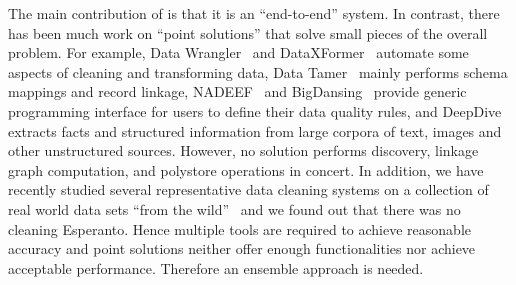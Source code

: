 \smallskip
The main contribution of \dcv is that it is an ``end-to-end'' system. In contrast, there has been much work on ``point solutions'' that solve small pieces of the overall problem. 
For example, Data Wrangler~\cite{2011-wrangler} and DataXFormer~\cite{DBLP:conf/icde/AbedjanMIOPS16} automate some aspects of cleaning and transforming data, Data
Tamer~\cite{DBLP:conf/cidr/StonebrakerBIBCZPX13} mainly performs schema mappings and record linkage,
NADEEF~\cite{DBLP:conf/sigmod/DallachiesaEEEIOT13} and BigDansing~\cite{bigdansing} provide generic programming interface for users to define their data quality rules, and DeepDive~\cite{DBLP:journals/pvldb/ShinWWSZR15} extracts
facts and structured information from large corpora of text, images and other
unstructured sources. However, no solution performs  discovery, linkage graph
computation, and polystore operations in concert. 
In addition, we have recently
studied several representative data cleaning systems on a collection of real
world data sets ``from the wild''~\cite{DBLP:journals/pvldb/AbedjanCDFIOPST16}
and we found out that there was no cleaning Esperanto. 
Hence multiple tools are required to achieve reasonable accuracy and point solutions neither offer enough functionalities nor achieve acceptable performance. Therefore an ensemble approach is needed.
